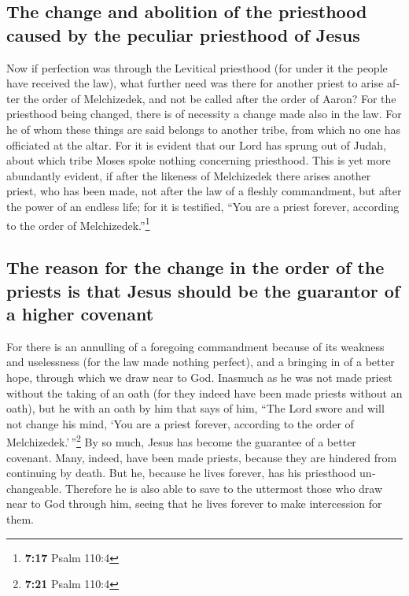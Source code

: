 \begin{paracol}{2}
\begin{otherlanguage}{english}
\hypertarget{the-change-and-abolition-of-the-priesthood-caused-by-the-peculiar-priesthood-of-jesus}{%
\subsection{The change and abolition of the priesthood caused by the
peculiar priesthood of
Jesus}\label{the-change-and-abolition-of-the-priesthood-caused-by-the-peculiar-priesthood-of-jesus}}

 Now if perfection was through the Levitical priesthood
(for under it the people have received the law), what further need was
there for another priest to arise after the order of Melchizedek, and
not be called after the order of Aaron?  For the
priesthood being changed, there is of necessity a change made also in
the law.  For he of whom these things are said belongs to
another tribe, from which no one has officiated at the altar.
 For it is evident that our Lord has sprung out of Judah,
about which tribe Moses spoke nothing concerning priesthood.
 This is yet more abundantly evident, if after the
likeness of Melchizedek there arises another priest,  who
has been made, not after the law of a fleshly commandment, but after the
power of an endless life;  for it is testified, ``You are
a priest forever, according to the order of Melchizedek.''\footnote{\textbf{7:17}
  Psalm 110:4}

\hypertarget{the-reason-for-the-change-in-the-order-of-the-priests-is-that-jesus-should-be-the-guarantor-of-a-higher-covenant}{%
\subsection{The reason for the change in the order of the priests is
that Jesus should be the guarantor of a higher
covenant}\label{the-reason-for-the-change-in-the-order-of-the-priests-is-that-jesus-should-be-the-guarantor-of-a-higher-covenant}}

 For there is an annulling of a foregoing commandment
because of its weakness and uselessness  (for the law
made nothing perfect), and a bringing in of a better hope, through which
we draw near to God.  Inasmuch as he was not made priest
without the taking of an oath  (for they indeed have been
made priests without an oath), but he with an oath by him that says of
him, ``The Lord swore and will not change his mind, `You are a priest
forever, according to the order of Melchizedek.'\,''\footnote{\textbf{7:21}
  Psalm 110:4}  By so much, Jesus has become the
guarantee of a better covenant.  Many, indeed, have been
made priests, because they are hindered from continuing by death.
 But he, because he lives forever, has his priesthood
unchangeable.  Therefore he is also able to save to the
uttermost those who draw near to God through him, seeing that he lives
forever to make intercession for them.


\end{otherlanguage}
\end{paracol}
